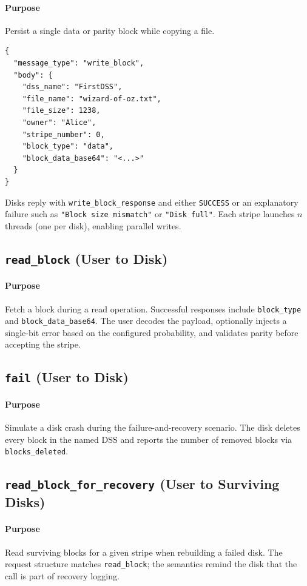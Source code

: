\documentclass[11pt]{article}
\begin{document}
\paragraph{Purpose} Persist a single data or parity block while copying a file.
\begin{verbatim}
{
  "message_type": "write_block",
  "body": {
    "dss_name": "FirstDSS",
    "file_name": "wizard-of-oz.txt",
    "file_size": 1238,
    "owner": "Alice",
    "stripe_number": 0,
    "block_type": "data",
    "block_data_base64": "<...>"
  }
}
\end{verbatim}
Disks reply with \texttt{write\_block\_response} and either \texttt{SUCCESS} or an explanatory failure such as \texttt{"Block size mismatch"} or \texttt{"Disk full"}. Each stripe launches $n$ threads (one per disk), enabling parallel writes.

\subsection{\texttt{read\_block} (User to Disk)}
\paragraph{Purpose} Fetch a block during a read operation. Successful responses include \texttt{block\_type} and \texttt{block\_data\_base64}. The user decodes the payload, optionally injects a single-bit error based on the configured probability, and validates parity before accepting the stripe.

\subsection{\texttt{fail} (User to Disk)}
\paragraph{Purpose} Simulate a disk crash during the failure-and-recovery scenario. The disk deletes every block in the named DSS and reports the number of removed blocks via \texttt{blocks\_deleted}.

\subsection{\texttt{read\_block\_for\_recovery} (User to Surviving Disks)}
\paragraph{Purpose} Read surviving blocks for a given stripe when rebuilding a failed disk. The request structure matches \texttt{read\_block}; the semantics remind the disk that the call is part of recovery logging.
\end{document}

